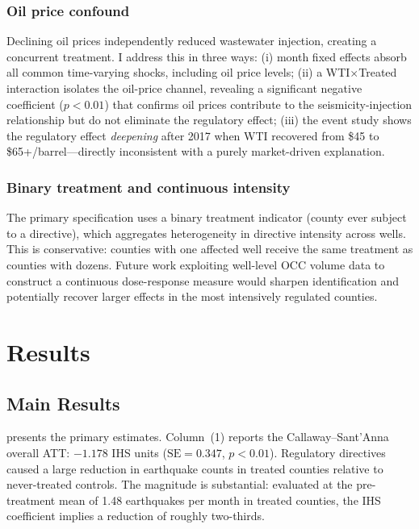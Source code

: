 \documentclass[12pt]{article}
\begin{document}
\subsubsection*{Oil price confound} Declining oil prices independently reduced wastewater injection, creating a concurrent treatment. I address this in three ways: (i) month fixed effects absorb all common time-varying shocks, including oil price levels; (ii) a WTI$\times$Treated interaction isolates the oil-price channel, revealing a significant negative coefficient ($p < 0.01$) that confirms oil prices contribute to the seismicity-injection relationship but do not eliminate the regulatory effect; (iii) the event study shows the regulatory effect \textit{deepening} after 2017 when WTI recovered from \$45 to \$65+/barrel---directly inconsistent with a purely market-driven explanation.

\subsubsection*{Binary treatment and continuous intensity} The primary specification uses a binary treatment indicator (county ever subject to a directive), which aggregates heterogeneity in directive intensity across wells. This is conservative: counties with one affected well receive the same treatment as counties with dozens. Future work exploiting well-level OCC volume data to construct a continuous dose-response measure would sharpen identification and potentially recover larger effects in the most intensively regulated counties.

\section{Results}

\subsection{Main Results}

 presents the primary estimates. Column~(1) reports the Callaway--Sant'Anna overall ATT: $-1.178$ IHS units ($\text{SE} = 0.347$, $p < 0.01$). Regulatory directives caused a large reduction in earthquake counts in treated counties relative to never-treated controls. The magnitude is substantial: evaluated at the pre-treatment mean of 1.48 earthquakes per month in treated counties, the IHS coefficient implies a reduction of roughly two-thirds.


\end{document}

